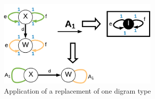 \documentclass[a4paper]{scrartcl}
\begin{document}
\begin{figure}[h]
	\centering
	\includegraphics[width=0.7\textwidth]{img/type9}
	\caption{Application of a replacement of one digram type}
	\label{fig:type9}
\end{figure}











\pagebreak
\end{document}
